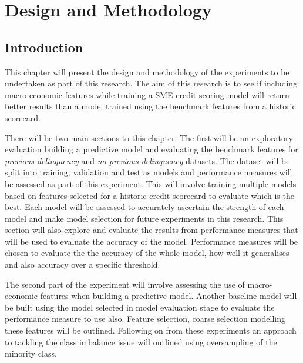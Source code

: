 
\chapter{Design and Methodology} %

\label{Chapter4} %


\section{Introduction}

This chapter will present the design and methodology of the experiments to be undertaken as part of this research. The aim of this research is to see if including macro-economic features while training a SME credit scoring model will return better results than a model trained using the benchmark features from a historic scorecard. 

There will be two main sections to this chapter. The first will be an exploratory evaluation building a predictive model and evaluating the benchmark features for \textit{previous delinquency} and \textit{no previous delinquency} datasets. The dataset will be split into training, validation and test as models and performance measures will be assessed as part of this experiment. This will involve training multiple models based on features selected for a historic credit scorecard to evaluate which is the best. Each model will be assessed to accurately ascertain the strength of each model and make model selection for future experiments in this research. This section will also explore and evaluate the results from performance measures that will be used  to evaluate the accuracy of the model. Performance measures will be chosen to evaluate the the accuracy of the whole model, how well it generalises and also accuracy over a specific threshold. 

The second part of the experiment will involve assessing the use of macro-economic features when building a predictive model. Another baseline model will be built using the model selected in model evaluation stage to evaluate the performance measure to use also. Feature selection, coarse selection  modelling these features will be outlined. Following on from these experiments an approach to tackling the class imbalance issue will outlined using oversampling of the minority class.


